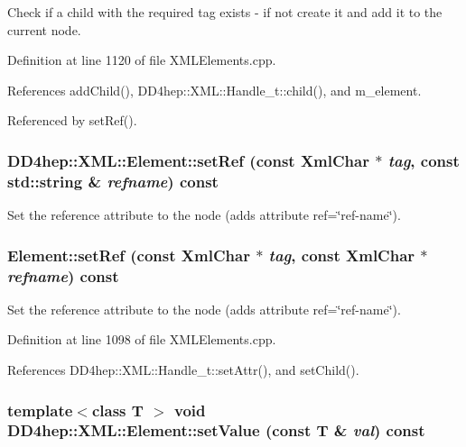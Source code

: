 Check if a child with the required tag exists -\/ if not create it and add it to the current node. 

Definition at line 1120 of file XMLElements.cpp.

References addChild(), DD4hep::XML::Handle\_\-t::child(), and m\_\-element.

Referenced by setRef().\hypertarget{class_d_d4hep_1_1_x_m_l_1_1_element_a6e09d39f370e992ccff1d6a5a9aea9d5}{
\subsubsection[{setRef}]{ DD4hep::XML::Element::setRef (const {\bf XmlChar} $\ast$ {\em tag}, \/  const std::string \& {\em refname}) const}}
\label{class_d_d4hep_1_1_x_m_l_1_1_element_a6e09d39f370e992ccff1d6a5a9aea9d5}


Set the reference attribute to the node (adds attribute ref=\char`\"{}ref-\/name\char`\"{}). \hypertarget{class_d_d4hep_1_1_x_m_l_1_1_element_a481707ff2e5959e9b15193d80e85632a}{
\subsubsection[{setRef}]{ Element::setRef (const {\bf XmlChar} $\ast$ {\em tag}, \/  const {\bf XmlChar} $\ast$ {\em refname}) const}}
\label{class_d_d4hep_1_1_x_m_l_1_1_element_a481707ff2e5959e9b15193d80e85632a}


Set the reference attribute to the node (adds attribute ref=\char`\"{}ref-\/name\char`\"{}). 

Definition at line 1098 of file XMLElements.cpp.

References DD4hep::XML::Handle\_\-t::setAttr(), and setChild().\hypertarget{class_d_d4hep_1_1_x_m_l_1_1_element_ac7987875ec4adbd81a46f0f0aebd11bf}{
\subsubsection[{setValue}]{\setlength{\rightskip}{0pt plus 5cm}template$<$class T $>$ void DD4hep::XML::Element::setValue (const {\bf T} \& {\em val}) const}}
\label{class_d_d4hep_1_1_x_m_l_1_1_element_ac7987875ec4adbd81a46f0f0aebd11bf}


